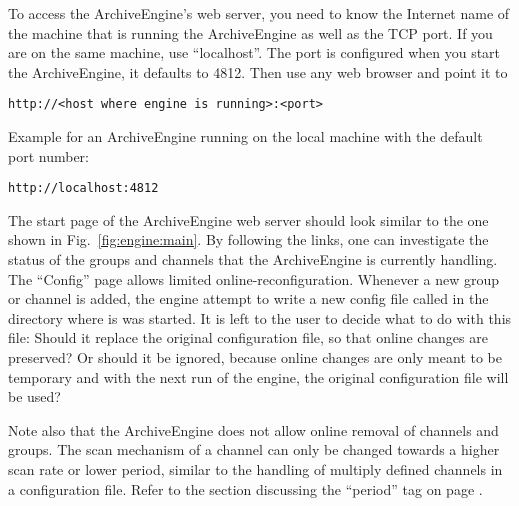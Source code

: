 To access the ArchiveEngine's web server, you need to know the
Internet name of the machine that is running the ArchiveEngine as well
as the TCP port.  If you are on the same machine, use ``localhost''.
The port is configured when you start the ArchiveEngine, it defaults
to 4812. Then use any web browser and point it to

\begin{lstlisting}[frame=none,keywordstyle=\sffamily]
 http://<host where engine is running>:<port>
\end{lstlisting}

\noindent Example for an ArchiveEngine running on the local machine with the
default port number:

\begin{lstlisting}[frame=none,keywordstyle=\sffamily]
http://localhost:4812
\end{lstlisting}

\noindent The start page of the ArchiveEngine web server should look
similar to the one shown in Fig.~\ref{fig:engine:main}. By following
the links, one can investigate the status of the groups and channels
that the ArchiveEngine is currently handling. The ``Config'' page
allows limited online-reconfiguration. Whenever a new group or channel
is added, the engine attempt to write a new config file called
 in the directory where is was started.
It is left to the user to decide what to do with this file: Should it
replace the original configuration file, so that online changes are
preserved? Or should it be ignored, because online changes are only
meant to be temporary and with the next run of the engine, the
original configuration file will be used?

Note also that the ArchiveEngine does not allow online removal of
channels and groups. The scan mechanism of a channel can only be
changed towards a higher scan rate or lower period, similar to the
handling of multiply defined channels in a configuration file. Refer
to the section discussing the ``period'' tag on page \pageref{sec:period}.


